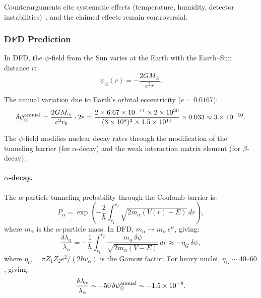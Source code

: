 \documentclass[aps,prb,twocolumn,superscriptaddress,floatfix,nofootinbib,longbibliography]{revtex4-2}
\begin{document}
Counterarguments cite systematic effects (temperature, humidity, detector
instabilities)~\cite{Norman2009,Bellotti2013,Pomme2016}, and the
claimed effects remain controversial.

\subsubsection{DFD Prediction}

In DFD, the $\psi$-field from the Sun varies at the Earth with the
Earth--Sun distance $r$:
\begin{equation}
\psi_\odot(r) = -\frac{2GM_\odot}{c^2 r}.
\label{eq:psi-sun}
\end{equation}

The annual variation due to Earth's orbital eccentricity
($e = 0.0167$):
\begin{equation}
\delta\psi_\odot^{\rm annual} = \frac{2GM_\odot}{c^2 r_0}\cdot 2e
= \frac{2\times 6.67\times 10^{-11}\times 2\times 10^{30}}
{(3\times 10^8)^2 \times 1.5\times 10^{11}}\times 0.033
\approx 3 \times 10^{-10}.
\label{eq:psi-annual}
\end{equation}

The $\psi$-field modifies nuclear decay rates through the modification
of the tunneling barrier (for $\alpha$-decay) and the weak interaction
matrix element (for $\beta$-decay):

\paragraph{$\alpha$-decay.}
The $\alpha$-particle tunneling probability through the Coulomb barrier
is:
\begin{equation}
P_\alpha = \exp\!\left(-\frac{2}{\hbar}\int_{r_1}^{r_2}
\sqrt{2m_\alpha(V(r) - E)}\,dr\right),
\label{eq:alpha-tunnel}
\end{equation}
where $m_\alpha$ is the $\alpha$-particle mass.  In DFD,
$m_\alpha \to m_\alpha\,e^{\psi}$, giving:
\begin{equation}
\frac{\delta\lambda_\alpha}{\lambda_\alpha} = -\frac{1}{\hbar}
\int_{r_1}^{r_2}\frac{m_\alpha\,\delta\psi}
{\sqrt{2m_\alpha(V-E)}}\,dr \approx -\eta_G\,\delta\psi,
\label{eq:alpha-shift}
\end{equation}
where $\eta_G = \pi Z_1 Z_2 e^2/(2\hbar v_\alpha)$ is the Gamow factor.
For heavy nuclei, $\eta_G \sim 40$--$60$, giving:
\begin{equation}
\frac{\delta\lambda_\alpha}{\lambda_\alpha} \sim -50\,\delta\psi_\odot^{\rm annual}
\sim -1.5 \times 10^{-8}.
\label{eq:alpha-annual}
\end{equation}
\end{document}
